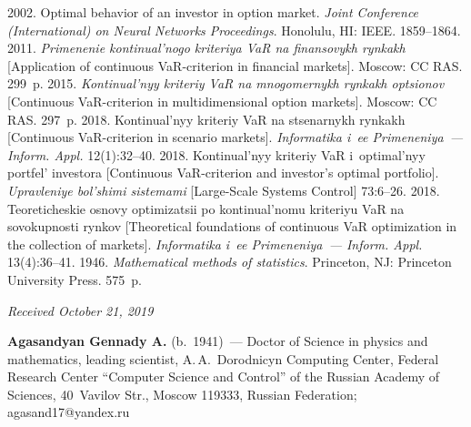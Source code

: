  \begin{multicols}{2}

\renewcommand{\bibname}{\protect\rmfamily References}

{\small\frenchspacing
 {%
 \begin{thebibliography}{9}
   2002. Optimal behavior of an investor in option market. 
\textit{Joint Conference (International) on Neural Networks Proceedings}. 
Honolulu, HI: IEEE. 
1859--1864. 
   2011. \textit{Primenenie kontinual'nogo kriteriya VaR 
na finansovykh rynkakh} [Application of continuous VaR-criterion in financial 
markets]. Moscow: CC RAS. 299~p. 
   2015. \textit{Kontinual'nyy kriteriy VaR na 
mnogomernykh rynkakh optsionov} [Continuous VaR-criterion in multidimensional 
option markets]. Moscow: CC RAS. 297~p. 
   2018. Kontinual'nyy kriteriy VaR na stsenarnykh 
rynkakh [Continuous VaR-criterion in scenario markets]. \textit{Informatika i~ee 
Primeneniya~--- Inform. Appl.} 12(1):32--40. 
   2018. Kontinual'nyy kriteriy VaR i~optimal'nyy portfel' 
investora [Continuous VaR-criterion and investor's optimal portfolio]. 
\textit{Upravleniye bol'shimi sistemami} [Large-Scale Systems Control] 73:6--26.
   2018. Teoreticheskie osnovy opti\-mi\-za\-tsii po 
kontinual'nomu kriteriyu VaR na sovokupnosti rynkov [Theoretical foundations of 
continuous VaR optimization in the collection of markets]. \textit{Informatika i~ee 
Primeneniya~--- Inform. Appl.} 13(4):36--41. 
   1946. \textit{Mathematical methods of statistics}. Princeton, NJ: 
Princeton University Press. 575~p.
\end{thebibliography}

 }
 }

\end{multicols}

\vspace*{-9pt}

\hfill{\small\textit{Received October 21, 2019}}


\vspace*{-20pt}
  
  \Contrl
  
  \vspace*{-4pt}
  
  \noindent
  \textbf{Agasandyan Gennady A.} (b.\ 1941)~--- Doctor of Science in physics and 
mathematics, leading scientist, A.\,A.~Dorodnicyn Computing Center, Federal 
Research Center ``Computer Science and Control'' of the Russian Academy of 
Sciences, 40~Vavilov Str., Moscow 119333, Russian Federation; 
\mbox{agasand17@yandex.ru}
  

   
\label{end\stat}

\renewcommand{\bibname}{\protect\rm Литература} 
   